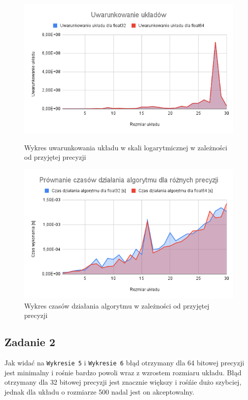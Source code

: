 \documentclass{article}
\begin{document}
\begin{figure}[H]
  \begin{minipage}[b]{0.49\textwidth}
    \includegraphics[width=\textwidth]{img03.png}
    \caption{Wykres uwarunkowania układu w skali logarytmicznej w zależności od przyjętej precyzji}
  \end{minipage}
  \hfill
  \begin{minipage}[b]{0.49\textwidth}
    \includegraphics[width=\textwidth]{img04.png}
    \caption{Wykres czasów działania algorytmu w zależności od przyjętej precyzji}
  \end{minipage}
\end{figure}


\newpage

\subsection{Zadanie 2}

Jak widać na \texttt{Wykresie 5} i \texttt{Wykresie 6} błąd otrzymany dla 64 bitowej precyzji jest minimalny i rośnie bardzo powoli wraz z wzrostem rozmiaru układu. Błąd otrzymany dla 32 bitowej precyzji jest znacznie większy i rośńie dużo szybciej, jednak dla układu o rozmiarze 500 nadal jest on akceptowalny.
\end{document}
